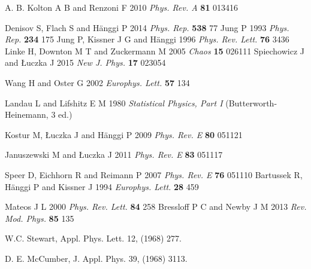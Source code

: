 \documentclass[12pt]{iopart}
\begin{document}
\begin{thebibliography}{99}
   A. B. Kolton A B and  Renzoni F 2010 \textit{ Phys. Rev.  A}  \textbf{81}  013416 

Denisov S, Flach S and H\"anggi P 2014 \textit{Phys. Rep.} \textbf{538} 77 
Jung P 1993 \textit{Phys. Rep.} \textbf{234} 175
  Jung P, Kissner J G and H\"anggi 1996 \textit{Phys. Rev. Lett.} \textbf{76} 3436
  Linke H, Downton M T and Zuckermann M 2005 \textit{Chaos} \textbf{15} 026111
Spiechowicz J and {\L}uczka J 2015 \textit{New J. Phys.} \textbf{17} 023054

 Wang H and Oster G 2002 \textit{Europhys. Lett.} \textbf{57}  134

 Landau L and Lifshitz E M 1980 \textit{Statistical Physics, Part I} (Butterworth-Heinemann, 3 ed.) 

 Kostur M, {\L}uczka J and H\"anggi P 2009 \textit{Phys. Rev. E} \textbf{80} 051121

 Januszewski M and  {\L}uczka J 2011 \textit{Phys. Rev. E} \textbf{83} 051117

Speer D, Eichhorn R and Reimann P 2007 \textit{Phys. Rev. E} \textbf{76} 051110
Bartussek R, H\"anggi P and Kissner J 1994 \textit{Europhys. Lett.} \textbf{28} 459

Mateos J L 2000 \textit{Phys. Rev. Lett.} \textbf{84} 258
Bressloff P C and Newby J M 2013 \textit{Rev. Mod. Phys.} \textbf{85} 135

W.C. Stewart, Appl. Phys. Lett. 12, (1968) 277.

D. E. McCumber, J. Appl. Phys.   39, (1968) 3113.
\end{thebibliography}
\end{document}
